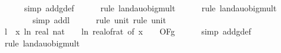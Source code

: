 \begin{isabellebody}
\ \ \ \ \isamarkupfalse%
\ {\isacharparenleft}{\kern0pt}simp\ add{\isacharcolon}{\kern0pt}g{\isacharunderscore}{\kern0pt}def{\isacharparenright}{\kern0pt}\isanewline
\ \ \ \ \isamarkupfalse%
\ {\isacharparenleft}{\kern0pt}rule\ landau{\isacharunderscore}{\kern0pt}o{\isachardot}{\kern0pt}big{\isacharunderscore}{\kern0pt}mult{\isacharunderscore}{\kern0pt}{}{\isacharparenright}{\kern0pt}\isanewline
\ \ \ \ \isamarkupfalse%
\ {\isacharparenleft}{\kern0pt}rule\ landau{\isacharunderscore}{\kern0pt}o{\isachardot}{\kern0pt}big{\isacharunderscore}{\kern0pt}mult{\isacharunderscore}{\kern0pt}{}{\isacharparenright}{\kern0pt}\isanewline
\ \ \ \ \ \ \isamarkupfalse%
\ {\isacharparenleft}{\kern0pt}simp\ add{\isacharcolon}{\kern0pt}l{}{\isacharparenright}{\kern0pt}\isanewline
\ \ \ \ \isamarkupfalse%
\ {\isacharparenleft}{\kern0pt}rule\ unit{\isacharunderscore}{\kern0pt}{}{\isacharcomma}{\kern0pt}\ rule\ unit{\isacharunderscore}{\kern0pt}{}{\isacharparenright}{\kern0pt}\isanewline
\isanewline
\ \ \isamarkupfalse%
\ l{}{\isacharcolon}{\kern0pt}\ {\isachardoublequoteopen}\ {\isacharparenleft}{\kern0pt}{\isasymlambda}x{\isachardot}{\kern0pt}\ ln\ {\isacharparenleft}{\kern0pt}real\ {\isacharparenleft}{\kern0pt}nat\ {\isasymlceil}{\isacharminus}{\kern0pt}\ {\isacharparenleft}{\kern0pt}{}{}\ {\isacharasterisk}{\kern0pt}\ ln\ {\isacharparenleft}{\kern0pt}real{\isacharunderscore}{\kern0pt}of{\isacharunderscore}{\kern0pt}rat\ {\isacharparenleft}{\kern0pt}{\isasymepsilon}{\isacharunderscore}{\kern0pt}of\ x{\isacharparenright}{\kern0pt}{\isacharparenright}{\kern0pt}{\isacharparenright}{\kern0pt}{\isasymrceil}{\isacharparenright}{\kern0pt}\ {\isacharplus}{\kern0pt}\ {}{\isacharparenright}{\kern0pt}{\isacharparenright}{\kern0pt}\ {\isasymin}\ O{\isacharbrackleft}{\kern0pt}{\isacharquery}{\kern0pt}F{\isacharbrackright}{\kern0pt}{\isacharparenleft}{\kern0pt}g{\isacharparenright}{\kern0pt}{\isachardoublequoteclose}\isanewline
\ \ \ \ \isamarkupfalse%
\ {\isacharparenleft}{\kern0pt}simp\ add{\isacharcolon}{\kern0pt}g{\isacharunderscore}{\kern0pt}def{\isacharparenright}{\kern0pt}\isanewline
\ \ \ \ \isamarkupfalse%
\ {\isacharparenleft}{\kern0pt}rule\ landau{\isacharunderscore}{\kern0pt}o{\isachardot}{\kern0pt}big{\isacharunderscore}{\kern0pt}mult{\isacharunderscore}{\kern0pt}{}{\isacharparenright}{\kern0pt}\isanewline
\ \ \ \ \ \isamarkupfalse%

\end{isabellebody}
